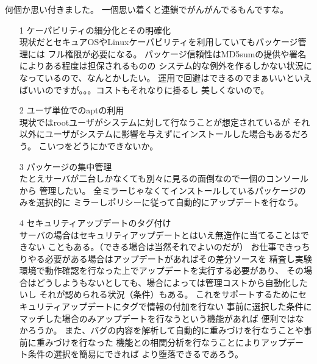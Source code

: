 \documentclass[cjk,dvipdfmx]{beamer}
\begin{document}
\begin{frame}
 何個か思い付きました。
 一個思い着くと連鎖でがんがんでるもんですな。

 \begin{enumerate}
 \item[1]  ケーパビリティの細分化とその明確化\\
 現状だとセキュアOSやLinuxケーパビリティを利用していてもパッケージ管理には
 フル権限が必要になる。
 パッケージ信頼性はMD5sumの提供や署名によりある程度は担保されるものの
 システム的な例外を作るしかない状況になっているので、なんとかしたい。
 運用で回避はできるのでまぁいいといえばいいのですが。。。コストもそれなりに掛るし
 美しくないので。
 \end{enumerate}
\end{frame}
\begin{frame}
\begin{enumerate}
 \item[2] ユーザ単位でのaptの利用\\
 現状ではrootユーザがシステムに対して行なうことが想定されているが
 それ以外にユーザがシステムに影響を与えずにインストールした場合もあるだろう。
 こいつをどうにかできないか。

 \item[3] パッケージの集中管理\\
 たとえサーバが二台しかなくても別々に見るの面倒なので一個のコンソールから
 管理したい。
 全ミラーじゃなくてインストールしているパッケージのみを選択的に
 ミラーしポリシーに従って自動的にアップデートを行なう。

 \end{enumerate}
\end{frame}
\begin{frame}
\begin{enumerate}

 \item[4] セキュリティアップデートのタグ付け\\
 サーバの場合はセキュリティアップデートとはいえ無造作に当てることはできない
 こともある。（できる場合は当然それでよいのだが）
 お仕事できっちりやる必要がある場合はアップデートがあればその差分ソースを
 精査し実験環境で動作確認を行なった上でアップデートを実行する必要があり、
 その場合はどうしようもないとしても、場合によっては管理コストから自動化したいし
 それが認められる状況（条件）もある。
 これをサポートするためにセキュリティアップデートにタグで情報の付加を行ない
 事前に選択した条件にマッチした場合のみアップデートを行なうという機能があれば
 便利ではなかろうか。
 また、バグの内容を解析して自動的に重みづけを行なうことや事前に重みづけを行なった
 機能との相関分析を行なうことによりアップデート条件の選択を簡易にできれば
 より堕落できるであろう。

 \end{enumerate}
\end{frame}
\end{document}
